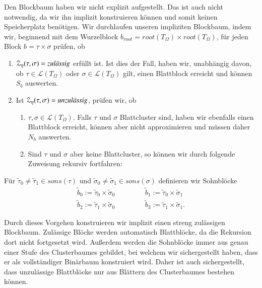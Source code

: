     Den Blockbaum haben wir nicht explizit aufgestellt. Das ist auch nicht notwendig, da wir ihn implizit konstruieren können und somit keinen Speicherplatz benötigen.
    Wir durchlaufen unseren impliziten Blockbaum, indem wir, beginnend mit dem Wurzelblock $b_{root} = root(T_\Omega) \times root(T_\Omega)$, für jeden Block $b = \tau \times \sigma$ prüfen, ob
    \begin{enumerate}
      \item $\mathcal{Z}_\eta(\tau,\sigma) = \text{\textit{zulässig}}$ erfüllt ist. Ist dies der Fall, haben wir, unabhängig davon, ob $\tau \in \mathcal{L}(T_\Omega)$ oder 
      $\sigma \in \mathcal{L}(T_\Omega)$ gilt, einen Blattblock erreicht und können $S_b$ auswerten. 
      \item Ist $\mathcal{Z}_\eta(\tau,\sigma) = \text{\textit{unzulässig}}$, prüfen wir, ob 
      \begin{enumerate}
	\item $\tau, \sigma \in \mathcal{L}(T_\Omega)$. Falls $\tau$ und $\sigma$ Blattcluster sind, haben wir ebenfalls einen Blattblock erreicht, können aber nicht approximieren und müssen
	daher $N_b$ auswerten.
	\item Sind $\tau$ und $\sigma$ aber keine Blattcluster, so können wir durch folgende Zuweisung rekursiv fortfahren:	
      \end{enumerate}
    \end{enumerate}
    Für $\tilde \tau_0 \neq \tilde \tau_1 \in sons(\tau)$ und $\tilde \sigma_0 \neq \tilde \sigma_1 \in sons(\sigma)$ definieren wir Sohnblöcke
    \begin{align*}
      \tilde b_0 := \tilde \tau_0 \times \tilde \sigma_0 & \ \ \ \ \ \ \ \ \ \ \ \ & \tilde b_1 := \tilde \tau_0 \times \tilde \sigma_1\\
      \tilde b_2 := \tilde \tau_1 \times \tilde \sigma_0 & \ \ \ \ \ \ \ \ \ \ \ \ & \tilde b_3 := \tilde \tau_1 \times \tilde \sigma_1.
    \end{align*}
    
    Durch dieses Vorgehen konstruieren wir implizit einen streng zulässigen Blockbaum. Zulässige Blöcke werden automatisch Blattblöcke, da die Rekursion dort nicht fortgesetzt wird.
    Außerdem werden die Sohnblöcke immer aus genau einer Stufe des Clusterbaumes gebildet, bei welchem wir sichergestellt haben, dass er als vollständiger Binärbaum konstruiert wird. 
    Daher ist auch sichergestellt, dass unzulässige Blattblöcke nur aus Blättern des Clusterbaumes bestehen können.
    
